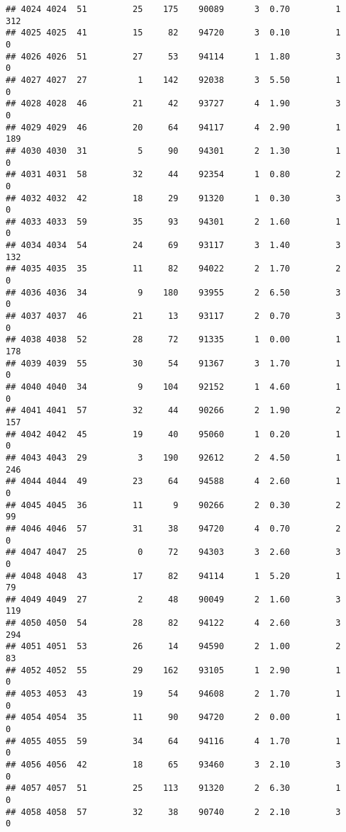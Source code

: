\documentclass[
]{article}
\begin{document}
\begin{verbatim}
## 4024 4024  51         25    175    90089      3  0.70         1      312
## 4025 4025  41         15     82    94720      3  0.10         1        0
## 4026 4026  51         27     53    94114      1  1.80         3        0
## 4027 4027  27          1    142    92038      3  5.50         1        0
## 4028 4028  46         21     42    93727      4  1.90         3        0
## 4029 4029  46         20     64    94117      4  2.90         1      189
## 4030 4030  31          5     90    94301      2  1.30         1        0
## 4031 4031  58         32     44    92354      1  0.80         2        0
## 4032 4032  42         18     29    91320      1  0.30         3        0
## 4033 4033  59         35     93    94301      2  1.60         1        0
## 4034 4034  54         24     69    93117      3  1.40         3      132
## 4035 4035  35         11     82    94022      2  1.70         2        0
## 4036 4036  34          9    180    93955      2  6.50         3        0
## 4037 4037  46         21     13    93117      2  0.70         3        0
## 4038 4038  52         28     72    91335      1  0.00         1      178
## 4039 4039  55         30     54    91367      3  1.70         1        0
## 4040 4040  34          9    104    92152      1  4.60         1        0
## 4041 4041  57         32     44    90266      2  1.90         2      157
## 4042 4042  45         19     40    95060      1  0.20         1        0
## 4043 4043  29          3    190    92612      2  4.50         1      246
## 4044 4044  49         23     64    94588      4  2.60         1        0
## 4045 4045  36         11      9    90266      2  0.30         2       99
## 4046 4046  57         31     38    94720      4  0.70         2        0
## 4047 4047  25          0     72    94303      3  2.60         3        0
## 4048 4048  43         17     82    94114      1  5.20         1       79
## 4049 4049  27          2     48    90049      2  1.60         3      119
## 4050 4050  54         28     82    94122      4  2.60         3      294
## 4051 4051  53         26     14    94590      2  1.00         2       83
## 4052 4052  55         29    162    93105      1  2.90         1        0
## 4053 4053  43         19     54    94608      2  1.70         1        0
## 4054 4054  35         11     90    94720      2  0.00         1        0
## 4055 4055  59         34     64    94116      4  1.70         1        0
## 4056 4056  42         18     65    93460      3  2.10         3        0
## 4057 4057  51         25    113    91320      2  6.30         1        0
## 4058 4058  57         32     38    90740      2  2.10         3        0

\end{verbatim}
\end{document}
